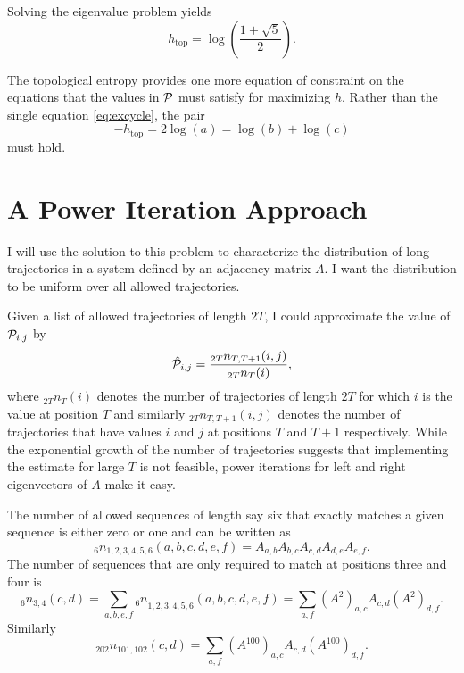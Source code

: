 \documentclass[12pt]{article} \usepackage{amsmath,amsfonts}
\newcommand{\htop}{{h_{\text{top}}}}
\newcommand{\T}{{\cal P}}
\begin{document}
Solving the eigenvalue problem yields
\begin{equation*}
  \htop = \log\left(\frac{1+\sqrt{5}}{2}\right).
\end{equation*}

The topological entropy provides one more equation of constraint on
the equations that the values in $\T$ must satisfy for maximizing $h$.
Rather than the single equation \eqref{eq:excycle}, the pair
\begin{equation*}
  - \htop = 2\log(a) = \log(b) + \log(c)
\end{equation*}
must hold.

\section{A Power Iteration Approach}
\label{sec:algorithm}

I will use the solution to this problem to characterize the
distribution of long trajectories in a system defined by an adjacency
matrix $A$.  I want the distribution to be uniform over all allowed
trajectories.

Given a list of allowed trajectories of length $2T$, I could
approximate the value of $\T_{i,j}$ by
\begin{equation*}
  \hat \T_{i,j} = \frac{_{2T}n_{T,T+1}(i,j)}{_{2T}n_{T}(i)},
\end{equation*}
where $_{2T}n_{T}(i)$ denotes the number of trajectories of length
$2T$ for which $i$ is the value at position $T$ and similarly
$_{2T}n_{T,T+1}(i,j)$ denotes the number of trajectories that have
values $i$ and $j$ at positions $T$ and $T+1$ respectively.  While the
exponential growth of the number of trajectories suggests that
implementing the estimate for large $T$ is not feasible, power
iterations for left and right eigenvectors of $A$ make it easy.

The number of allowed sequences of length say six that exactly matches
a given sequence is either zero or one and can be written as
\begin{equation*}
  _6n_{1,2,3,4,5,6}(a,b,c,d,e,f) = A_{a,b}A_{b,c}A_{c,d}A_{d,e}A_{e,f}.
\end{equation*}
The number of sequences that are only required to match at positions
three and four is
\begin{equation*}
 _6n_{3,4}(c,d) =  \sum_{a,b,e,f} {_6n}_{1,2,3,4,5,6}(a,b,c,d,e,f) =
 \sum_{a,f} \left(A^2\right)_{a,c} A_{c,d} \left(A^2\right)_{d,f}.
\end{equation*}
Similarly
\begin{equation*}
 _{202}n_{101,102}(c,d) = \sum_{a,f} \left(A^{100}\right)_{a,c} A_{c,d} \left(A^{100}\right)_{d,f}.
\end{equation*}
\end{document}
